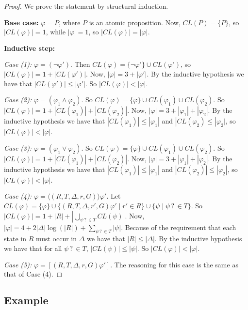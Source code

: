 \documentclass{lmcs}
\theoremstyle{definition}
\newcommand{\dbox}[1]{\langle #1 \rangle}
\newcommand{\bbox}[1]{[ #1 ]}
\DeclareMathOperator{\?}{?}
\begin{document}
\pagebreak[5]
\begin{proof}
  We prove the statement by structural induction.

  \textbf{Base case:} $\varphi = P$, where $P$ is an atomic proposition. Now, $CL(P) = \{P\}$, so $|CL(\varphi)| = 1$, while $|\varphi| = 1$, so $|CL(\varphi)| = |\varphi|$.

  \textbf{Inductive step:}

  \textit{Case (1):} $\varphi = (\neg\varphi')$. Then $CL(\varphi) = \{\neg\varphi'\} \cup CL(\varphi')$, so $|CL(\varphi)| = 1 + |CL(\varphi')|$. Now, $|\varphi| = 3 + |\varphi'|$. By the inductive hypothesis we have that $|CL(\varphi')| \leq |\varphi'|$. So $|CL(\varphi)| < |\varphi|$.



  \textit{Case (2):} $\varphi = (\varphi_1 \wedge \varphi_2)$. So $CL(\varphi) = \{\varphi\} \cup CL(\varphi_1) \cup CL(\varphi_2)$. So $|CL(\varphi)| = 1 + |CL(\varphi_1)| + |CL(\varphi_2)|$. Now, $|\varphi| = 3 + |\varphi_1| + |\varphi_2|$. By the inductive hypothesis we have that $|CL(\varphi_1)| \leq |\varphi_1|$ and $|CL(\varphi_2) \leq |\varphi_2|$, so $|CL(\varphi)| < |\varphi|$.

  \textit{Case (3):} $\varphi = (\varphi_1 \vee \varphi_2)$. So $CL(\varphi) = \{\varphi\} \cup CL(\varphi_1) \cup CL(\varphi_2)$. So $|CL(\varphi)| = 1 + |CL(\varphi_1)| + |CL(\varphi_2)|$. Now, $|\varphi| = 3 + |\varphi_1| + |\varphi_2|$. By the inductive hypothesis we have that $|CL(\varphi_1)| \leq |\varphi_1|$ and $|CL(\varphi_2)| \leq |\varphi_2|$, so $|CL(\varphi)| < |\varphi|$.

  \textit{Case (4):} $\varphi = \dbox{(R,T,\Delta,r,G)}\varphi'$. Let $CL(\varphi) = \{\varphi\} \cup \{(R,T,\Delta,r',G)\varphi' \mid r' \in R \} \cup \{ \psi \mid \psi\? \in T\}$. So $|CL(\varphi)| = 1 + |R| + |\bigcup\limits_{\psi\? \in T}CL(\psi)|$. Now, $|\varphi| = 4 + 2|\Delta|\log(|R|) + \sum\limits_{\psi\? \in T}|\psi|$. Because of the requirement that each state in $R$ must occur in $\Delta$ we have that $|R| \leq |\Delta|$. By the inductive hypothesis we have that for all $\psi\? \in T$, $|CL(\psi)| \leq |\psi|$. So $|CL(\varphi)| < |\varphi|$.

  \textit{Case (5):} $\varphi = \bbox{(R,T,\Delta,r,G)\varphi'}$. The reasoning for this case is the same as that of Case (4).
\end{proof}

\subsection{Example}
\end{document}
